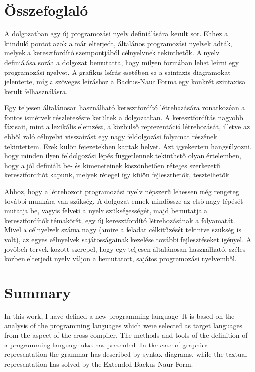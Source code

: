 \chapter*{Összefoglaló}


A dolgozatban egy új programozási nyelv definiálására került sor. Ehhez a kiinduló pontot azok a már elterjedt, általános programozási nyelvek adták, melyek a keresztfordító szempontjából célnyelvnek tekinthetők. A nyelv definiálása során a dolgozat bemutatta, hogy milyen formában lehet leírni egy programozási nyelvet. A grafikus leírás esetében ez a szintaxis diagramokat jelentette, míg a szöveges leíráshoz a Backus-Naur Forma egy konkrét szintaxisa került felhasználásra.

Egy teljesen általánosan használható keresztfordító létrehozására vonatkozóan a fontos ismérvek részletezésre kerültek a dolgozatban. A keresztfordítás nagyobb fázisait, mint a lexikális elemzést, a közbülső reprezentáció létrehozását, illetve az ebből való célnyelvi visszaírást egy nagy feldolgozási folyamat részének tekintettem. Ezek külön fejezetekben kaptak helyet. Azt igyekeztem hangsúlyozni, hogy minden ilyen feldolgozási lépés függetlennek tekinthető olyan értelemben, hogy a jól definiált be- és kimeneteinek köszönhetően réteges szerkezetű keresztfordítót kapunk, melyek rétegei így külön fejleszthetők, tesztelhetők.

Ahhoz, hogy a létrehozott programozási nyelv népszerű lehessen még rengeteg további munkára van szükség. A dolgozat ennek mindössze az első nagy lépését mutatja be, vagyis felveti a nyelv szükségességét, majd bemutatja a keresztfordítók témakörét, egy új keresztfordító létrehozásának a folyamatát. Mivel a célnyelvek száma nagy (amire a feladat célkitűzését tekintve szükség is volt), az egyes célnyelvek sajátosságainak kezelése további fejlesztéseket igényel. A jövőbeli tervek között szerepel, hogy egy teljesen általánosan használható, széles körben elterjedt nyelv váljon a bemutatott, sajátos programozási nyelvemből.

\chapter*{Summary}

In this work, I have defined a new programming language. It is based on the analysis of the programming languages which were selected as target languages from the aspect of the cross compiler. The methods and tools of the definition of a programming language also has presented. In the case of graphical representation the grammar has described by syntax diagrams, while the textual representation has solved by the Extended Backus-Naur Form.

